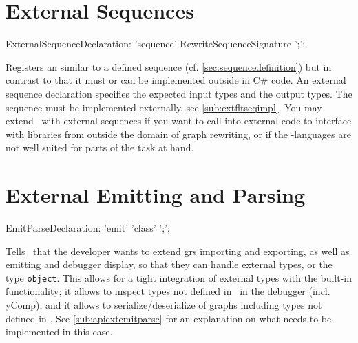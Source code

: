 \section{External Sequences}\label{sub:extseq}
\begin{rail}
  ExternalSequenceDeclaration: 
    'sequence' RewriteSequenceSignature ';';
\end{rail}
Registers an  similar to a defined sequence (cf. \ref{sec:sequencedefinition}) but in contrast to that it must or can be implemented outside in C\# code.
An external sequence declaration specifies the expected input types and the output types. The sequence must be implemented externally, see \ref{sub:extfltseqimpl}.
You may extend \GrG~with external sequences if you want to call into external code to interface with libraries from outside the domain of graph rewriting, or if the \GrG-languages are not well suited for parts of the task at hand.

\section{External Emitting and Parsing}\label{sub:extemitparse}
\begin{rail}
  EmitParseDeclaration: 'emit' 'class' ';';
\end{rail}
Tells \GrG~that the developer wants to extend grs importing and exporting, as well as emitting and debugger display, so that they can handle external types, or the type \texttt{object}.
This allows for a tight integration of external types with the built-in functionality;
it allows to inspect types not defined in \GrG~in the debugger (incl. yComp),
and it allows to serialize/deserialize of graphs including types not defined in \GrG.
See \ref{sub:apiextemitparse} for an explanation on what needs to be implemented in this case.

